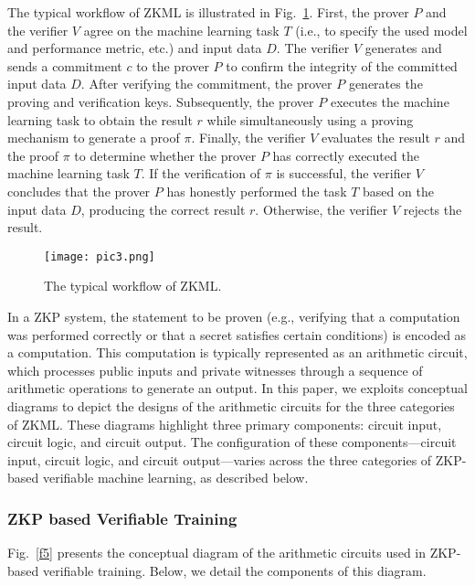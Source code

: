 \documentclass[journal]{IEEEtran}
\begin{document}
The typical workflow of ZKML is illustrated in Fig.~\ref{f3}. First, the prover $P$ and the verifier $V$ agree on the machine learning task $T$ (i.e., to specify the used model and performance metric, etc.) and input data $D$. The verifier $V$ generates and sends a commitment $c$ to the prover $P$ to confirm the integrity of the committed input data $D$. After verifying the commitment, the prover $P$ generates the proving and verification keys. Subsequently, the prover $P$ executes the machine learning task to obtain the result $r$ while simultaneously using a proving mechanism to generate a proof $\pi$. Finally, the verifier $V$ evaluates the result $r$ and the proof $\pi$ to determine whether the prover $P$ has correctly executed the machine learning task $T$. If the verification of $\pi$ is successful, the verifier $V$ concludes that the prover $P$ has honestly performed the task $T$ based on the input data $D$, producing the correct result $r$. Otherwise, the verifier $V$ rejects the result.


\begin{figure}[t]
    \centering
    \texttt{[image: pic3.png]}
    \caption{The typical workflow of ZKML.}
    \label{f3}
\end{figure}


In a ZKP system, the statement to be proven (e.g., verifying that a computation was performed correctly or that a secret satisfies certain conditions) is encoded as a computation. This computation is typically represented as an arithmetic circuit, which processes public inputs and private witnesses through a sequence of arithmetic operations to generate an output. In this paper, we exploits conceptual diagrams to  depict the designs of the arithmetic circuits for the three categories of ZKML. These diagrams highlight three primary components: circuit input, circuit logic, and circuit output. The configuration of these components---circuit input, circuit logic, and circuit output---varies across the three categories of ZKP-based verifiable machine learning, as described below.


\subsubsection{\bf ZKP based Verifiable Training} Fig.~\ref{f5} presents the conceptual diagram of the arithmetic circuits used in ZKP-based verifiable training. Below, we detail the components of this diagram. 
\end{document}
